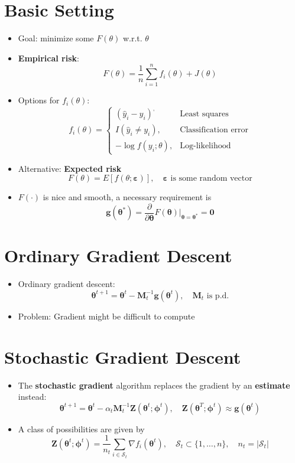 \documentclass[
  letterpaper,
  DIV=11,
  numbers=noendperiod]{scrreprt}
\theoremstyle{definition}
\theoremstyle{definition}
\theoremstyle{remark}
\begin{document}
\section{Basic Setting}\label{basic-setting}

\begin{itemize}
\item
  Goal: minimize some \(F(\theta)\) w.r.t. \(\theta\)
\item
  \textbf{Empirical risk}: \[
  F(\theta) = \frac{1}{n}\sum_{i=1}^n f_i (\theta) + J(\theta)
  \]
\item
  Options for \(f_i (\theta)\): \[
  f_i (\theta) = 
  \begin{cases}
  (\hat{y}_i - y_i)^, & \text{Least squares}\\
  I(\hat{y}_i \neq y_i), & \text{Classification error}\\
  -\log f(y_i; \theta), & \text{Log-likelihood}
  \end{cases}
  \]
\item
  Alternative: \textbf{Expected risk} \[
  F(\theta) = E[f(\theta; \pmb{\varepsilon})], \quad{}\pmb{\varepsilon} \text{ is some random vector}
  \]
\item
  \(F(\cdot)\) is nice and smooth, a necessary requirement is \[
  \pmb{g}(\pmb{\theta}^{*}) = \frac{\partial}{\partial \pmb{\theta}}F(\pmb{\theta})|_{\pmb{\theta}=\pmb{\theta}^{*}} = \pmb{0}
  \]
\end{itemize}

\section{Ordinary Gradient Descent}\label{ordinary-gradient-descent}

\begin{itemize}
\item
  Ordinary gradient descent: \[
  \pmb{\theta}^{t+1} = \pmb{\theta}^{t} - \pmb{M}_t^{-1}\pmb{g}(\pmb{\theta}^t), \quad{} \pmb{M}_t \text{ is p.d.}
  \]
\item
  Problem: Gradient might be difficult to compute
\end{itemize}

\section{Stochastic Gradient Descent}\label{stochastic-gradient-descent}

\begin{itemize}
\item
  The \textbf{stochastic gradient} algorithm replaces the gradient by an
  \textbf{estimate} instead: \[
  \pmb{\theta}^{t+1} = \pmb{\theta}^t -\alpha_t \pmb{M}_t^{-1}\pmb{Z}(\pmb{\theta}^{t};\pmb{\phi}^t), \quad{} \pmb{Z}(\pmb{\theta}^T; \pmb{\phi}^t) \approx \pmb{g} (\pmb{\theta}^t)
  \]
\item
  A class of possibilities are given by \[
  \pmb{Z}(\pmb{\theta}^{t}; \pmb{\phi}^t) = \frac{1}{n_t} \sum_{i \in \mathcal{S}_t} \nabla f_i (\pmb{\theta}^t), \quad{} \mathcal{S}_t \subset \{ 1, \ldots, n\}, \quad{} n_t = |\mathcal{S}_t|
  \]
\end{itemize}
\end{document}
